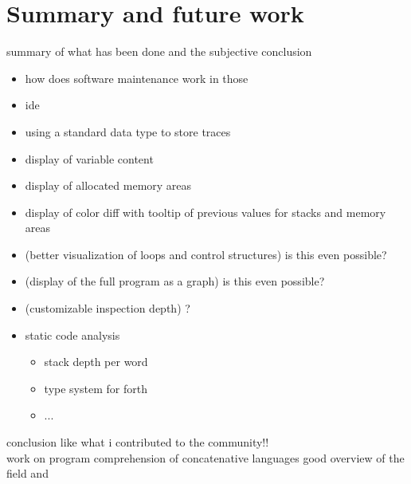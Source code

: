 \chapter{Summary and future work}

summary of what has been done and the subjective conclusion

\begin{itemize}
\item how does software maintenance work in those
\item ide
\item using a standard data type to store traces
\item display of variable content
\item display of allocated memory areas
\item display of color diff with tooltip of previous values for stacks and memory areas
\item (better visualization of loops and control structures) is this even possible?
\item (display of the full program as a graph) is this even possible?
\item (customizable inspection depth) ?
\item static code analysis
\begin{itemize}
\item stack depth per word
\item type system for forth
\item ...
\end{itemize}
\end{itemize}


conclusion like what i contributed to the community!!\\

work on program comprehension of concatenative languages
good overview of the field \cite{Canfora:2011:ACS:1924421.1924451} and \cite{Cornelissen2009}